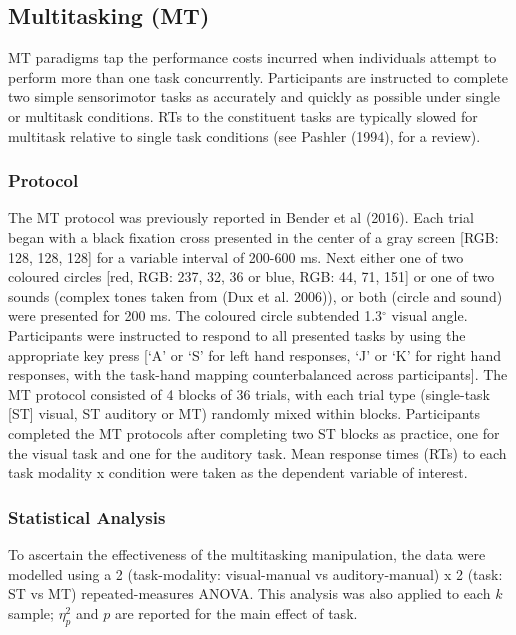 \documentclass{article}
\begin{document}
\hypertarget{multitasking-mt}{%
\subsection{Multitasking (MT)}\label{multitasking-mt}}

\label{sec:MTMeth}

MT paradigms tap the performance costs incurred when individuals attempt to perform more than one task concurrently. Participants are instructed to complete two simple sensorimotor tasks as accurately and quickly as possible under single or multitask conditions. RTs to the constituent tasks are typically slowed for multitask relative to single task conditions (see Pashler (1994), for a review).

\hypertarget{protocol-1}{%
\subsubsection{Protocol}\label{protocol-1}}

The MT protocol was previously reported in Bender et al (2016). Each trial began with a black fixation cross presented in the center of a gray screen {[}RGB: 128, 128, 128{]} for a variable interval of 200-600 ms. Next either one of two coloured circles {[}red, RGB: 237, 32, 36 or blue, RGB: 44, 71, 151{]} or one of two sounds (complex tones taken from (Dux et al. 2006)), or both (circle and sound) were presented for 200 ms. The coloured circle subtended 1.3\(^\circ\) visual angle. Participants were instructed to respond to all presented tasks by using the appropriate key press {[}`A' or `S' for left hand responses, `J' or `K' for right hand responses, with the task-hand mapping counterbalanced across participants{]}. The MT protocol consisted of 4 blocks of 36 trials, with each trial type (single-task {[}ST{]} visual, ST auditory or MT) randomly mixed within blocks. Participants completed the MT protocols after completing two ST blocks as practice, one for the visual task and one for the auditory task. Mean response times (RTs) to each task modality x condition were taken as the dependent variable of interest.

\hypertarget{statistical-analysis}{%
\subsubsection{Statistical Analysis}\label{statistical-analysis}}

To ascertain the effectiveness of the multitasking manipulation, the data were modelled using a 2 (task-modality: visual-manual vs auditory-manual) x 2 (task: ST vs MT) repeated-measures ANOVA. This analysis was also applied to each \(k\) sample; \(\eta_{p}^2\) and \(p\) are reported for the main effect of task.
\end{document}
